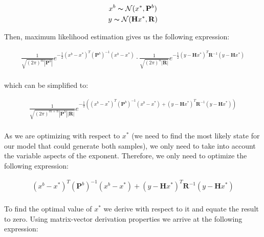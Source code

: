 \documentclass{article}
\begin{document}
\begin{gather*}
x^b \thicksim \mathcal{N}(x^*, \mathbf{P}^b) \\
y \thicksim \mathcal{N}(\mathbf{H} x^*, \mathbf{R}) \\
\end{gather*}

Then, maximum likelihood estimation gives us the following expression:

\begin{gather*}
\frac{1}{\sqrt{(2 \pi)^m |\mathbf{P}^b|}} e^{- \frac{1}{2} (x^b - x^*)^T (\mathbf{P}^b)^{-1} (x^b - x^*)} \cdot \frac{1}{\sqrt{(2 \pi)^n |\mathbf{R}|}} e^{- \frac{1}{2} (y - \mathbf{H} x^*)^T \mathbf{R}^{-1} (y - \mathbf{H} x^*)} \\
\end{gather*}

which can be simplified to:

\begin{gather*}
\frac{1}{\sqrt{(2 \pi)^{m + n} |\mathbf{P}^b| |\mathbf{R}|}} e^{- \frac{1}{2} ((x^b - x^*)^T (\mathbf{P}^b)^{-1} (x^b - x^*) + (y - \mathbf{H} x^*)^T \mathbf{R}^{-1} (y - \mathbf{H} x^*))} \\
\end{gather*}

As we are optimizing with respect to $x^*$ (we need to find the most likely state for our model that could generate both samples), we only need to take into account the variable aspects of the exponent. Therefore, we only need to optimize the following expression:

\begin{gather*}
(x^b - x^*)^T (\mathbf{P}^b)^{-1} (x^b - x^*) + (y - \mathbf{H} x^*)^T \mathbf{R}^{-1} (y - \mathbf{H} x^*) \\
\end{gather*}

To find the optimal value of $x^*$ we derive with respect to it and equate the result to zero. Using matrix-vector derivation properties we arrive at the following expression:
\end{document}
